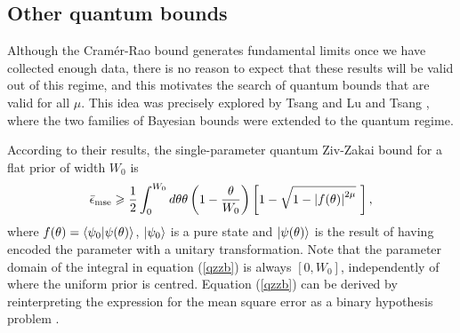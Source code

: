 \subsection{Other quantum bounds}
\label{subsec:alternativebounds}

Although the Cram\'{e}r-Rao bound generates fundamental limits once we have collected enough data, there is no reason to expect that these results will be valid out of this regime, and this motivates the search of quantum bounds that are valid for all $\mu$. This idea was precisely explored by Tsang \cite{tsang2012} and Lu and Tsang \cite{tsang2016}, where the two families of Bayesian bounds \cite{bayesbounds2007} were extended to the quantum regime. 

According to their results, the single-parameter quantum Ziv-Zakai bound for a flat prior of width $W_0$ is \cite{tsang2012}
\begin{equation}
\bar{\epsilon}_{\mathrm{mse}} \geqslant \frac{1}{2} \int_{0}^{W_0} d\theta \theta \left(1 - \frac{\theta}{W_0} \right) \left[1 - \sqrt{1 - \abs{f(\theta)}^{2\mu}} ~\right],
\label{qzzb}
\end{equation}
where $f(\theta) = \bra{\psi_0}\ket{\psi(\theta)}$, $\ket{\psi_0}$ is a pure state and $\ket{\psi(\theta)}$ is the result of having encoded the parameter with a unitary transformation. Note that the parameter domain of the integral in equation (\ref{qzzb}) is always $[0, W_0]$, independently of where the uniform prior is centred. Equation (\ref{qzzb}) can be derived by reinterpreting the expression for the mean square error as a binary hypothesis problem \citep{bayesbounds2007, tsang2012}. 


